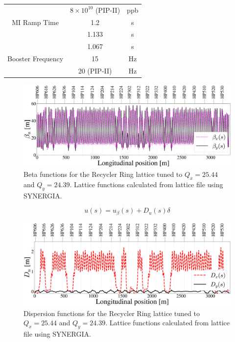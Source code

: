 \begin{table}[H]
\begin{tabular}{@{}ccc@{}}
                            & $8\times10^{10}$ (PIP-II)                  & ppb           \\
MI Ramp Time                & 1.2                                        & s             \\
                            & 1.133                                      & s             \\
                            & 1.067                                      & s             \\
Booster Frequency           & 15                                         & Hz            \\
                            & 20 (PIP-II)                                & Hz            \\ \bottomrule
\end{tabular}
\end{table}

\begin{figure}[H]
   \centering
   \includegraphics[width=\columnwidth]{chapter3/betas.png}
   \caption{Beta functions for the Recycler Ring lattice tuned to $Q_x=25.44$ and $Q_y=24.39$. Lattice functions calculated from lattice file using SYNERGIA.}
   \label{fig:rrbetas}
\end{figure}

\begin{equation}
   \label{eq:utotal}
   u(s) = u_{\beta}(s) + D_u(s) \delta
\end{equation}

\begin{figure}[H]
   \centering
   \includegraphics[width=\columnwidth]{chapter3/disps.png}
   \caption{Dispersion functions for the Recycler Ring lattice tuned to $Q_x=25.44$ and $Q_y=24.39$. Lattice functions calculated from lattice file using SYNERGIA.}
   \label{fig:rrdisps}
\end{figure}

